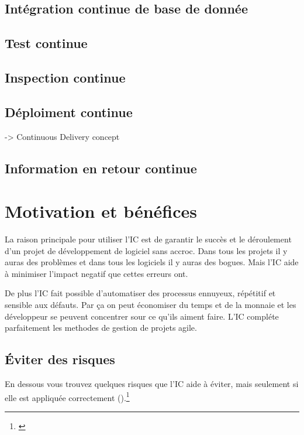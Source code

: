 \subsection{Intégration continue de base de donnée}

\subsection{Test continue}

\subsection{Inspection continue}

\subsection{Déploiment continue}

-> Continuous Delivery concept

\subsection{Information en retour continue}

\clearpage

\section{Motivation et bénéfices}

La raison principale pour utiliser l'IC est de garantir le succès et le déroulement d'un projet de développement de logiciel sans accroc. Dans tous les projets il y auras des problèmes et dans tous les logiciels il y auras des bogues. Mais l'IC aide à minimiser l'impact negatif que cettes erreurs ont.

De plus l'IC fait possible d'automatiser des processus ennuyeux, répétitif et sensible aux défauts. Par ça on peut économiser du temps et de la monnaie et les développeur se peuvent concentrer sour ce qu'ils aiment faire. L'IC compléte parfaitement les methodes de gestion de projets agile.

\subsection{Éviter des risques}
En dessous vous trouvez quelques risques que l'IC aide à éviter, mais seulement si elle est appliquée correctement ().\footnote{\cite[p39]{duvallconint}} 
